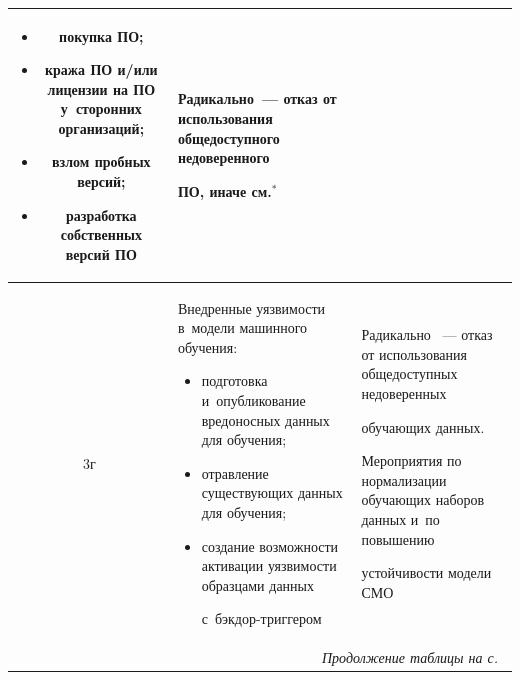 \begin{table}
\begin{center}
\begin{tabular}{|c|p{66mm}|p{50mm}|}
\begin{itemize}
\item покупка ПО; 

\item кража ПО и/или лицензии на ПО у~сторонних организаций;

\item взлом пробных версий;

\item разработка собственных версий ПО\vspace*{-6pt}

\end{itemize}&Радикально~--- отказ от использования общедоступного недоверенного 

ПО, иначе см.$^{*}$\\

\hline

3г&Внедренные уязвимости в~модели машинного обучения:\vspace*{-6pt}

\begin{itemize}

\addtolength{\itemsep}{-6pt}

\item подготовка и~опубликование вредоносных данных для обучения;

\item отравление существующих данных для обучения;

\item создание возможности активации уязвимости образцами данных  

с~бэк\-дор-триг\-ге\-ром\vspace*{-6pt} 

\end{itemize}&Радикально ~--- отказ от использования общедоступных недоверенных 

обуча\-ющих данных.\newline

Мероприятия по нормализации обуча\-ющих наборов данных и~по повышению 

устойчивости модели СМО\\

\hline

\multicolumn{3}{r}{\textit{Продолжение таблицы на с.}~\pageref{s2}}

\end{tabular}

\end{center}

\end{table}



